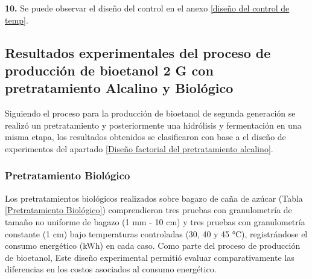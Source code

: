 \documentclass[12pt]{article}
\begin{document}
	     	
	     	\textbf{10.} Se puede observar el diseño del control en el anexo \ref{diseño del control de temp}.
	     	
	     	
			
			
		

				\subsection{Resultados experimentales del proceso de producción de bioetanol 2 G con pretratamiento Alcalino  y Biológico}
				Siguiendo el proceso para la producción de bioetanol de segunda generación se realizó un pretratamiento y posteriormente una hidrólisis y fermentación en una misma etapa, los resultados obtenidos se clasificaron con base a el diseño de experimentos del apartado \ref{Diseño factorial del pretratamiento alcalino}.
				
				
				
		
		\subsubsection{Pretratamiento Biológico}
	Los pretratamientos biológicos realizados sobre bagazo de caña de azúcar (Tabla \ref{Pretratamiento Biológico}) comprendieron tres pruebas con granulometría de tamaño no uniforme de bagazo (1 mm - 10 cm) y tres pruebas con granulometría constante (1 cm) bajo temperaturas controladas (30, 40 y 45 °C), registrándose el consumo energético (kWh) en cada caso. Como parte del proceso de producción de bioetanol,  Este diseño experimental permitió evaluar comparativamente las diferencias en los costos asociados al consumo energético. 
		
\end{document}
